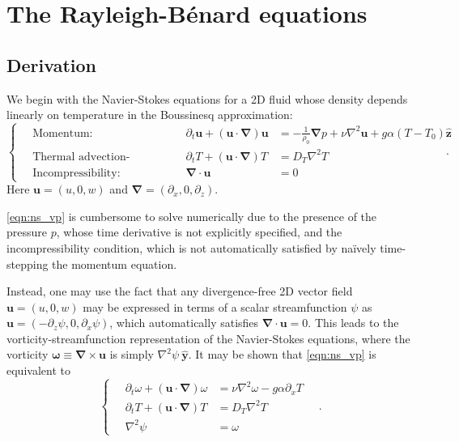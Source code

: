 \documentclass{article}
\renewcommand\vec{\bm}
\newcommand{\uvec}[1]{\vec{\hat{#1}}}
\newcommand{\grad}{\vec{\nabla}}
\newcommand{\rb}{Rayleigh-B\'{e}nard}
\begin{document}
\appendix
\section{The \rb{} equations}
\subsection{Derivation}
We begin with the Navier-Stokes equations for a 2D fluid whose density
depends linearly on temperature in the Boussinesq approximation:
\begin{equation} \label{eqn:ns_vp}
    \left\{ \quad
    \begin{alignedat}{2}
        \text{Momentum:}\quad &&
        \partial_t \vec{u} + (\vec{u} \cdot \grad) \vec{u}
            &= -\frac{1}{\rho_0} \grad p + \nu \nabla^2 \vec{u}
            + g\alpha (T - T_0) \uvec{z} \\
        \text{Thermal advection-diffusion:}\quad &&
        \partial_t T + (\vec{u} \cdot \grad) T &=  D_T \nabla^2 T \\
        \text{Incompressibility:}\quad &&
        \grad \cdot \vec{u} &= 0
    \end{alignedat}
    \right. \quad .
\end{equation}
Here $\vec{u} = (u, 0, w)$ and $\grad = (\partial_x, 0, \partial_z)$.

\autoref{eqn:ns_vp} is cumbersome to solve numerically due
to the presence of the pressure $p$, whose time derivative is not
explicitly specified, and the incompressibility condition, which is not
automatically satisfied by na\"{i}vely time-stepping the momentum
equation.

Instead, one may use the fact that any divergence-free 2D
vector field $\vec{u} = (u, 0, w)$ may be expressed in terms of a scalar
streamfunction $\psi$ as $\vec{u} = (-\partial_z \psi, 0, \partial_x
\psi)$, which automatically satisfies $\grad \cdot \vec{u} = 0$.
This leads to the vorticity-streamfunction representation of the
Navier-Stokes equations, where the vorticity $\vec{\omega} \equiv \grad
\times \vec{u}$ is simply $\nabla^2 \psi ~\uvec{y}$. It may be shown that
\autoref{eqn:ns_vp} is equivalent to
\begin{equation} \label{eqn:ns_omegapsi}
    \left\{ \quad
    \begin{aligned}
        \partial_t \omega + (\vec{u} \cdot \grad) \omega
            &= \nu \nabla^2 \omega - g \alpha \partial_x T \\
        \partial_t T + (\vec{u} \cdot \grad) T &=  D_T \nabla^2 T \\
        \nabla^2 \psi &= \omega
    \end{aligned}
    \right. \quad .
\end{equation}
\end{document}
